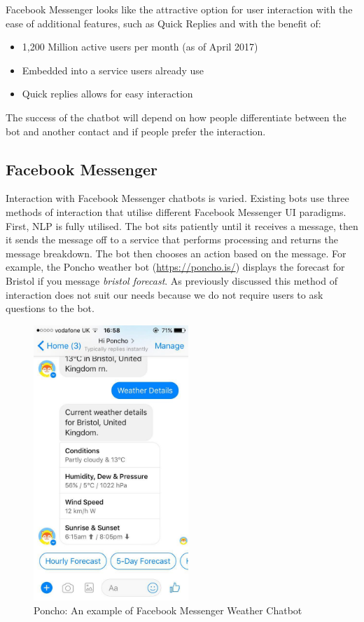 Facebook Messenger looks like the attractive option for user interaction with the ease of additional features, such as Quick Replies and with the benefit of:

\begin{itemize}
  \item 1,200 Million active users per month (as of April 2017)~\cite{fb_messenger_stats}
  \item Embedded into a service users already use
  \item Quick replies allows for easy interaction
\end{itemize}

The success of the chatbot will depend on how people differentiate between the bot and another contact and if people prefer the interaction.

\subsection*{Facebook Messenger}

Interaction with Facebook Messenger chatbots is varied. Existing bots use three methods of interaction that utilise different Facebook Messenger UI paradigms. First, NLP is fully utilised. The bot sits patiently until it receives a message, then it sends the message off to a service that performs processing and returns the message breakdown. The bot then chooses an action based on the message. For example, the Poncho weather bot (\url{https://poncho.is/}) displays the forecast for Bristol if you message \textit{bristol forecast}. As previously discussed this method of interaction does not suit our needs because we do not require users to ask questions to the bot.


\begin{figure}[H] %
    \centering
    \includegraphics[width=2.3in]{../resources/existing-bots/poncho.jpg}
    \caption{Poncho: An example of Facebook Messenger Weather Chatbot}
    \label{fig:poncho}
\end{figure}

